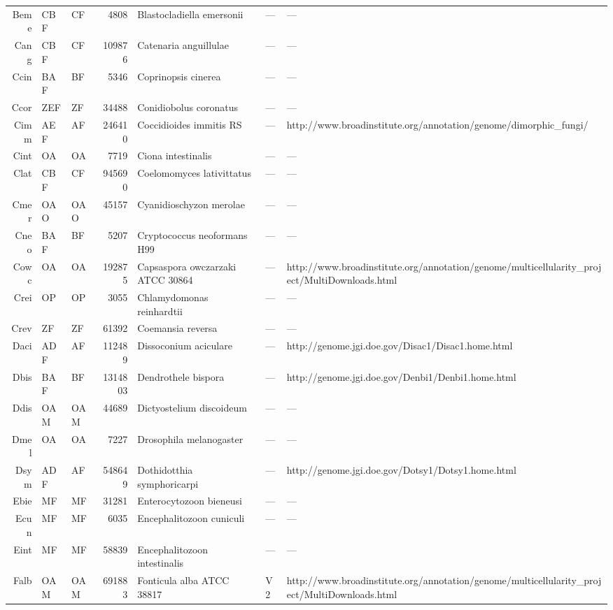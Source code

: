 \begin{table}[tbp]
\begin{tabular}{rllrlll}
  Beme & CBF & CF & 4808 & Blastocladiella emersonii & --- & --- \\ 
  Cang & CBF & CF & 109876 & Catenaria anguillulae & --- & --- \\ 
  Ccin & BAF & BF & 5346 & Coprinopsis cinerea & --- & --- \\ 
  Ccor & ZEF & ZF & 34488 & Conidiobolus coronatus & --- & --- \\ 
  Cimm & AEF & AF & 246410 & Coccidioides immitis RS & --- & http://www.broadinstitute.org/annotation/genome/dimorphic\_fungi/ \\ 
  Cint & OA & OA & 7719 & Ciona intestinalis & --- & --- \\ 
  Clat & CBF & CF & 945690 & Coelomomyces lativittatus & --- & --- \\ 
  Cmer & OAO & OAO & 45157 & Cyanidioschyzon merolae & --- & --- \\ 
  Cneo & BAF & BF & 5207 & Cryptococcus neoformans H99 & --- & --- \\ 
  Cowc & OA & OA & 192875 & Capsaspora owczarzaki ATCC 30864 & --- & http://www.broadinstitute.org/annotation/genome/multicellularity\_project/MultiDownloads.html \\ 
  Crei & OP & OP & 3055 & Chlamydomonas reinhardtii & --- & --- \\ 
  Crev & ZF & ZF & 61392 & Coemansia reversa & --- & --- \\ 
  Daci & ADF & AF & 112489 & Dissoconium aciculare & --- & http://genome.jgi.doe.gov/Disac1/Disac1.home.html \\ 
  Dbis & BAF & BF & 1314803 & Dendrothele bispora & --- & http://genome.jgi.doe.gov/Denbi1/Denbi1.home.html \\ 
  Ddis & OAM & OAM & 44689 & Dictyostelium discoideum & --- & --- \\ 
  Dmel & OA & OA & 7227 & Drosophila melanogaster & --- & --- \\ 
  Dsym & ADF & AF & 548649 & Dothidotthia symphoricarpi & --- & http://genome.jgi.doe.gov/Dotsy1/Dotsy1.home.html \\ 
  Ebie & MF & MF & 31281 & Enterocytozoon bieneusi & --- & --- \\ 
  Ecun & MF & MF & 6035 & Encephalitozoon cuniculi & --- & --- \\ 
  Eint & MF & MF & 58839 & Encephalitozoon intestinalis & --- & --- \\ 
  Falb & OAM & OAM & 691883 & Fonticula alba ATCC 38817 & V2 & http://www.broadinstitute.org/annotation/genome/multicellularity\_project/MultiDownloads.html \\ 

\end{tabular}
\end{table}

